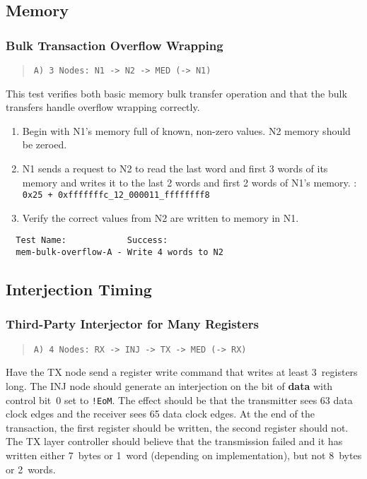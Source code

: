 \subsection{Memory}

\subsubsection{Bulk Transaction Overflow Wrapping}
\label{test:mem-bulk-overflow}

\begin{quote}
  \texttt{A) 3 Nodes: N1 -> N2 -> MED (-> N1)}
\end{quote}

This test verifies both basic memory bulk transfer operation and that the bulk
transfers handle overflow wrapping correctly.

\begin{enumerate}
  \item Begin with N1's memory full of known, non-zero values. N2 memory
    should be zeroed.
  \item N1 sends a request to N2 to read the last word and first 3 words
    of its memory and writes it to the last 2 words and first 2 words of N1's
    memory.
    \subitem {}: \texttt{0x25 + 0xfffffffc\_12\_000011\_ffffffff8}
  \item Verify the correct values from N2 are written to memory in N1.
\end{enumerate}

\begin{verbatim}
  Test Name:            Success:
  mem-bulk-overflow-A - Write 4 words to N2
\end{verbatim}

\subsection{Interjection Timing}

\subsubsection{Third-Party Interjector for Many Registers}
\label{test:inj-reg-long}

\begin{quote}
  \texttt{A) 4 Nodes: RX -> INJ -> TX -> MED (-> RX)}
\end{quote}

Have the TX node send a register write command that writes at least
3~registers long. The INJ node should generate an interjection on the 
bit of {\bf data} with control bit~0 set to {\tt !EoM}. The effect should be
that the transmitter sees 63 data clock edges and the receiver sees 65 data
clock edges. At the end of the transaction, the first register should be
written, the second register should not. The TX layer controller should
believe that the transmission failed and it has written either 7~bytes or
1~word (depending on implementation), but not 8~bytes or 2~words.

